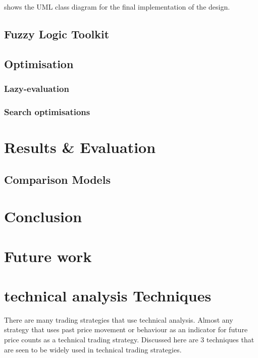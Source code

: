 \documentclass{article}
\theoremstyle{definition}
\begin{document}
 shows the UML class diagram for the final implementation of the design.

\subsection{Fuzzy Logic Toolkit}

\subsection{Optimisation}

\subsubsection{Lazy-evaluation}

\subsubsection{Search optimisations}

\section{Results \& Evaluation}

\label{results}

\subsection{Comparison Models}

\section{Conclusion}

\section{Future work}

\appendix


\section{technical analysis Techniques}

\label{app:tatechniques}

There are many trading strategies that use technical analysis. Almost any strategy that uses past price movement or behaviour as an indicator for future price counts as a technical trading strategy. Discussed here are 3 techniques that are seen to be widely used in technical trading strategies.
\end{document}
